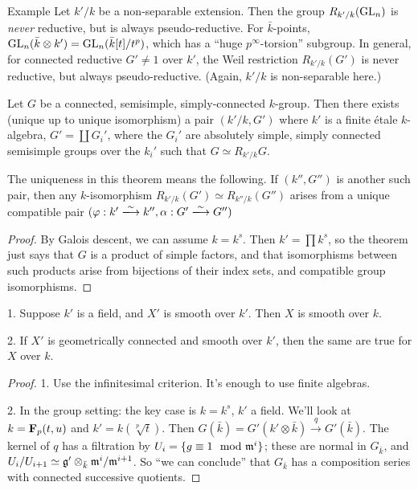 \begin{enonce}[remark]{Example}
Let $k'/k$ be a non-separable extension. Then the group 
$R_{k'/k}(\operatorname{GL}_n)$ is \emph{never} reductive, but is always 
pseudo-reductive. For $\bar k$-points, 
$\operatorname{GL}_n(\bar k\otimes k') = \operatorname{GL}_n(\bar k[t]/t^p)$, 
which has a ``huge $p^\infty$-torsion'' subgroup. In general, for 
connected reductive $G'\ne 1$ over $k'$, the Weil restriction 
$R_{k'/k}(G')$ is never reductive, but always pseudo-reductive. (Again, 
$k'/k$ is non-separable here.)
\end{enonce}

\begin{theo}
Let $G$ be a connected, semisimple, simply-connected $k$-group. Then there 
exists (unique up to unique isomorphism) a pair $(k'/k,G')$ where $k'$ is a finite 
\'etale $k$-algebra, $G'=\coprod G_i'$, where the $G_i'$ are absolutely 
simple, simply connected semisimple groups over the $k_i'$ such that 
$G\simeq R_{k'/k} G$. 
\end{theo}

The uniqueness in this theorem means the following. If $(k'',G'')$ is another 
such pair, then any $k$-isomorphism $R_{k'/k}(G')\simeq R_{k''/k} (G'')$ 
arises from a unique compatible pair 
$(\varphi:k'\isomorphism k'',\alpha:G'\isomorphism G'')$

\begin{proof}
By Galois descent, we can assume $k=k^s$. Then $k'=\prod k^s$, so the theorem 
just says that $G$ is a product of simple factors, and that isomorphisms between 
such products arise from bijections of their index sets, and compatible 
group isomorphisms. 
\end{proof}

\begin{lemm}
1. Suppose $k'$ is a field, and $X'$ is smooth over $k'$. Then $X$ is smooth over $k$. 

2. If $X'$ is geometrically connected and smooth over $k'$, then the same are true 
for $X$ over $k$. 
\end{lemm}
\begin{proof}
1. Use the infinitesimal criterion. It's enough to use finite algebras. 

2. In the group setting: the key case is $k=k^s$, $k'$ a field. We'll look at 
$k=\mathbf{F}_p(t,u)$ and $k'=k(\sqrt[p] t)$. Then 
$G(\bar k)=G'(k'\otimes \bar k)\xrightarrow q G'(\bar k)$. The kernel of $q$ 
has a filtration by $U_i=\{g\equiv 1 \mod {\mathfrak{m}}^i\}$; these are normal in 
$G_{\bar k}$, and $U_i/U_{i+1} \simeq \mathfrak{g}'\otimes_{\bar k} \mathfrak{m}^i/\mathfrak{m}^{i+1}$. 
So ``we can conclude'' that $G_{\bar k}$ has a composition series with 
connected successive quotients. 
\end{proof}

